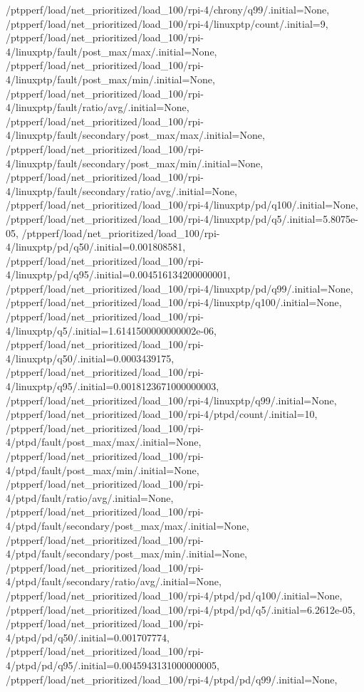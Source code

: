 {    /ptpperf/load/net_prioritized/load_100/rpi-4/chrony/q99/.initial=None,
    /ptpperf/load/net_prioritized/load_100/rpi-4/linuxptp/count/.initial=9,
    /ptpperf/load/net_prioritized/load_100/rpi-4/linuxptp/fault/post_max/max/.initial=None,
    /ptpperf/load/net_prioritized/load_100/rpi-4/linuxptp/fault/post_max/min/.initial=None,
    /ptpperf/load/net_prioritized/load_100/rpi-4/linuxptp/fault/ratio/avg/.initial=None,
    /ptpperf/load/net_prioritized/load_100/rpi-4/linuxptp/fault/secondary/post_max/max/.initial=None,
    /ptpperf/load/net_prioritized/load_100/rpi-4/linuxptp/fault/secondary/post_max/min/.initial=None,
    /ptpperf/load/net_prioritized/load_100/rpi-4/linuxptp/fault/secondary/ratio/avg/.initial=None,
    /ptpperf/load/net_prioritized/load_100/rpi-4/linuxptp/pd/q100/.initial=None,
    /ptpperf/load/net_prioritized/load_100/rpi-4/linuxptp/pd/q5/.initial=5.8075e-05,
    /ptpperf/load/net_prioritized/load_100/rpi-4/linuxptp/pd/q50/.initial=0.001808581,
    /ptpperf/load/net_prioritized/load_100/rpi-4/linuxptp/pd/q95/.initial=0.004516134200000001,
    /ptpperf/load/net_prioritized/load_100/rpi-4/linuxptp/pd/q99/.initial=None,
    /ptpperf/load/net_prioritized/load_100/rpi-4/linuxptp/q100/.initial=None,
    /ptpperf/load/net_prioritized/load_100/rpi-4/linuxptp/q5/.initial=1.6141500000000002e-06,
    /ptpperf/load/net_prioritized/load_100/rpi-4/linuxptp/q50/.initial=0.0003439175,
    /ptpperf/load/net_prioritized/load_100/rpi-4/linuxptp/q95/.initial=0.0018123671000000003,
    /ptpperf/load/net_prioritized/load_100/rpi-4/linuxptp/q99/.initial=None,
    /ptpperf/load/net_prioritized/load_100/rpi-4/ptpd/count/.initial=10,
    /ptpperf/load/net_prioritized/load_100/rpi-4/ptpd/fault/post_max/max/.initial=None,
    /ptpperf/load/net_prioritized/load_100/rpi-4/ptpd/fault/post_max/min/.initial=None,
    /ptpperf/load/net_prioritized/load_100/rpi-4/ptpd/fault/ratio/avg/.initial=None,
    /ptpperf/load/net_prioritized/load_100/rpi-4/ptpd/fault/secondary/post_max/max/.initial=None,
    /ptpperf/load/net_prioritized/load_100/rpi-4/ptpd/fault/secondary/post_max/min/.initial=None,
    /ptpperf/load/net_prioritized/load_100/rpi-4/ptpd/fault/secondary/ratio/avg/.initial=None,
    /ptpperf/load/net_prioritized/load_100/rpi-4/ptpd/pd/q100/.initial=None,
    /ptpperf/load/net_prioritized/load_100/rpi-4/ptpd/pd/q5/.initial=6.2612e-05,
    /ptpperf/load/net_prioritized/load_100/rpi-4/ptpd/pd/q50/.initial=0.001707774,
    /ptpperf/load/net_prioritized/load_100/rpi-4/ptpd/pd/q95/.initial=0.0045943131000000005,
    /ptpperf/load/net_prioritized/load_100/rpi-4/ptpd/pd/q99/.initial=None,
}

